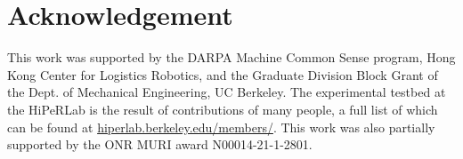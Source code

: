 \section{Acknowledgement}
This work was supported by the DARPA Machine Common Sense program, Hong Kong Center for Logistics Robotics, and the Graduate Division Block Grant of the Dept. of Mechanical Engineering, UC Berkeley.
 The experimental testbed at the HiPeRLab is the result of contributions of many people, a full list of which can be found at \url{hiperlab.berkeley.edu/members/}. This work was also partially supported by the ONR MURI award N00014-21-1-2801.